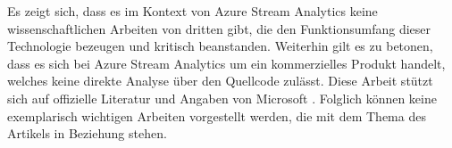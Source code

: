 Es zeigt sich, dass es im Kontext von Azure Stream Analytics keine wissenschaftlichen Arbeiten von dritten gibt, die den Funktionsumfang dieser Technologie bezeugen und kritisch beanstanden. Weiterhin gilt es zu betonen, dass es sich bei Azure Stream Analytics um ein kommerzielles Produkt handelt, welches keine direkte Analyse über den Quellcode zulässt. Diese Arbeit stützt sich auf offizielle Literatur und Angaben von Microsoft \cite{Familiar.2017} \cite{Klein.2017}. Folglich können keine exemplarisch wichtigen Arbeiten vorgestellt werden, die mit dem Thema des Artikels in Beziehung stehen.